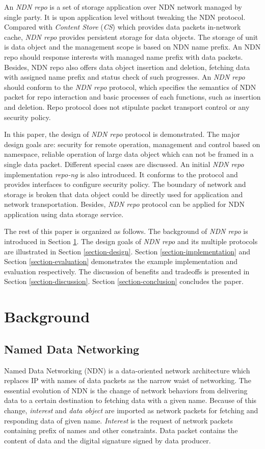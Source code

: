 \documentclass[conference]{IEEEtran}
\begin{document}
An \emph{NDN repo} is a set of storage application over NDN network managed by single party. It is upon application level without tweaking the NDN protocol. Compared with \emph{Content Store} (\emph{CS}) which provides data packets in-network cache, \emph{NDN repo} provides persistent storage for data objects. The storage of unit is data object and the management scope is based on NDN name prefix. An NDN repo should response interests with managed name prefix with data packets. Besides, NDN repo also offers data object insertion and deletion, fetching data with assigned name prefix and status check of such progresses. An \emph{NDN repo} should conform to the \emph{NDN repo} protocol, which specifies the semantics of NDN packet for repo interaction and basic processes of each functions, such as insertion and deletion. Repo protocol does not stipulate packet transport control or any security policy.

In this paper, the design of \emph{NDN repo} protocol is demonstrated. The major design goals are: security for remote operation, management and control based on namespace, reliable operation of large data object which can not be framed in a single data packet. Different special cases are discussed. An initial \emph{NDN repo} implementation \emph{repo-ng} is also introduced. It conforms to the protocol and provides interfaces to configure security policy. The boundary of network and storage is broken that data object could be directly used for application and network transportation. Besides, \emph{NDN repo} protocol can be applied for NDN application using data storage service.

The rest of this paper is organized as follows.  The background of \emph{NDN repo} is introduced in Section \ref{section-background}. The design goals of \emph{NDN repo} and its multiple protocols are illustrated in Section \ref{section-design}. Section \ref{section-implementation} and Section \ref{section-evaluation} demonstrates the example implementation and evaluation respectively.  The discussion of benefits and tradeoffs is presented in Section \ref{section-discussion}. Section \ref{section-conclusion} concludes the paper.

\section{Background} \label{section-background}
\subsection{Named Data Networking}
Named Data Networking (NDN) \cite{zhang2010named} is a data-oriented network architecture which replaces IP with names of data packets as the narrow waist of networking. The essential evolution of NDN is the change of network behaviors from delivering data to a certain destination to fetching data with a given name. \cite{zhang2010named} Because of this change, \emph{interest} and \emph{data object} are imported as network packets for fetching and responding data of given name. \emph{Interest} is the request of network packets containing prefix of names and other constraints. Data packet contains the content of data and the digital signature signed by data producer.
\end{document}
